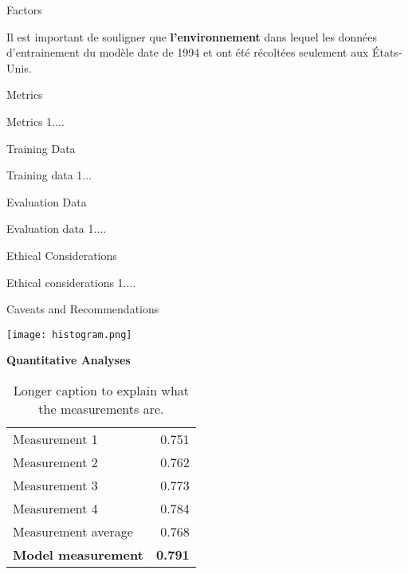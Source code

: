 \documentclass{article}
\begin{document}
\begin{adjustwidth}{-60pt}{-70pt}
\begin{singlespace}
\begin{tcolorbox}[title=\textbf{Model Card -Antoine Savage-Duguay},
    breakable, sharp corners, boxrule=0.7pt]
{\begin{mcsection}{Factors}
    \item Il est important de souligner que \textbf{l'environnement} dans lequel les données d'entrainement du modèle date de 1994 et ont été récoltées seulement aux États-Unis.
\end{mcsection}

\begin{mcsection}{Metrics}
    \item Metrics 1....
\end{mcsection}

\begin{mcsection}{Training Data}
    \item Training data 1...
\end{mcsection}

\pagebreak

\begin{mcsection}{Evaluation Data}
    \item Evaluation data 1....
\end{mcsection}

\begin{mcsection}{Ethical Considerations}
    \item Ethical considerations 1....
\end{mcsection}

\begin{mcsection}{Caveats and Recommendations}
\item
\texttt{[image: histogram.png]}\\[0cm]
\end{mcsection}

\textbf{Quantitative Analyses}

\begin{table}[H]
\centering
\small{
\begin{tabular}{lr}
Measurement 1       & 0.751  \\
Measurement 2       & 0.762 \\
Measurement 3       & 0.773 \\
Measurement 4       & 0.784 \\
Measurement average & 0.768  \\ \hline
\textbf{Model measurement}  & \textbf{0.791} \\ \hline
\end{tabular} } \\
\caption[Short caption used in list of tables.]{\small{Longer caption to explain what the measurements are.}}
\end{table}

} %
\end{tcolorbox}
\end{singlespace}
\end{adjustwidth}
\end{document}
